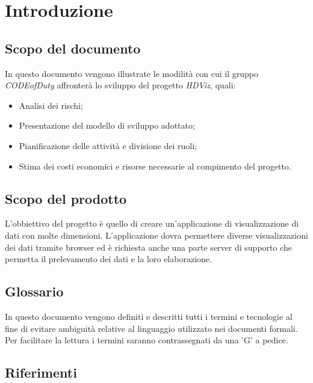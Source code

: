 \section{Introduzione}
\subsection{Scopo del documento}
	In questo documento vengono illustrate le modilità con cui il gruppo \emph{CODEofDuty} affronterà lo sviluppo del progetto \emph{HDViz}, quali:
	\begin{itemize}
    		\item Analisi dei rischi;
    		\item Presentazione del modello di sviluppo adottato;
    		\item Pianificazione delle attività e divisione dei ruoli;
    		\item Stima dei costi economici e risorse necessarie al compimento del progetto.
	\end{itemize}
\subsection{Scopo del prodotto}
	L'obbiettivo del progetto è quello di creare un'applicazione di visualizzazione di dati con molte dimensioni. L'applicazione dovra permettere diverse visualizzazioni dei dati tramite browser ed è richiesta anche una parte server di supporto che permetta il prelevamento dei dati e la loro elaborazione.
\subsection{Glossario}
	In questo documento vengono definiti e descritti tutti i termini e tecnologie al fine di evitare ambiguità relative al linguaggio utilizzato nei documenti formali. Per facilitare la lettura i termini saranno contrassegnati da una 'G' a pedice.  
\subsection{Riferimenti}
